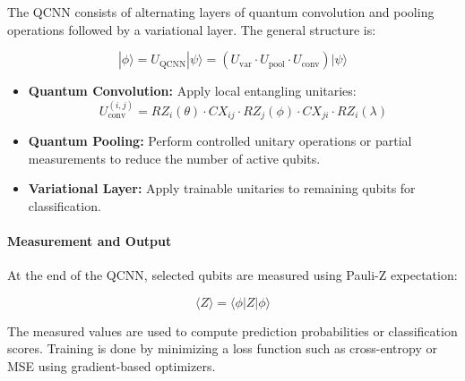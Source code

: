 \documentclass[conference]{IEEEtran}
\begin{document}
The QCNN consists of alternating layers of quantum convolution and pooling operations followed by a variational layer. The general structure is:

\begin{equation}
|\phi\rangle = U_{\text{QCNN}} |\psi\rangle = (U_{\text{var}} \cdot U_{\text{pool}} \cdot U_{\text{conv}}) |\psi\rangle
\end{equation}

\begin{itemize}
    \item \textbf{Quantum Convolution:} Apply local entangling unitaries:
    \[
    U^{(i,j)}_{\text{conv}} = RZ_i(\theta) \cdot CX_{ij} \cdot RZ_j(\phi) \cdot CX_{ji} \cdot RZ_i(\lambda)
    \]
    \item \textbf{Quantum Pooling:} Perform controlled unitary operations or partial measurements to reduce the number of active qubits.
    \item \textbf{Variational Layer:} Apply trainable unitaries to remaining qubits for classification.
\end{itemize}

\paragraph{Measurement and Output}

At the end of the QCNN, selected qubits are measured using Pauli-Z expectation:

\begin{equation}
\langle Z \rangle = \langle \phi | Z | \phi \rangle
\end{equation}

The measured values are used to compute prediction probabilities or classification scores. Training is done by minimizing a loss function such as cross-entropy or MSE using gradient-based optimizers.



\end{document}
